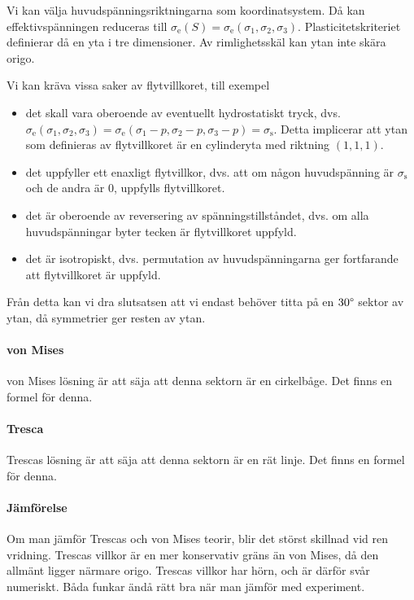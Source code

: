 Vi kan välja huvudspänningsriktningarna som koordinatsystem. Då kan effektivspänningen reduceras till $\sigma_{\text{e}}(S) = \sigma_{\text{e}}(\sigma_{1}, \sigma_{2}, \sigma_{3})$. Plasticitetskriteriet definierar då en yta i tre dimensioner. Av rimlighetsskäl kan ytan inte skära origo.

Vi kan kräva vissa saker av flytvillkoret, till exempel
\begin{itemize}
	\item det skall vara oberoende av eventuellt hydrostatiskt tryck, dvs. $\sigma_{\text{e}}(\sigma_{1}, \sigma_{2}, \sigma_{3}) = \sigma_{\text{e}}(\sigma_{1} - p, \sigma_{2}- p, \sigma_{3}- p) = \sigma_{\text{s}}$. Detta implicerar att ytan som definieras av flytvillkoret är en cylinderyta med riktning $(1, 1, 1)$.
	\item det uppfyller ett enaxligt flytvillkor, dvs. att om någon huvudspänning är $\sigma_{\text{s}}$ och de andra är $0$, uppfylls flytvillkoret.
	\item det är oberoende av reversering av spänningstillståndet, dvs. om alla huvudspänningar byter tecken är flytvillkoret uppfyld.
	\item det är isotropiskt, dvs. permutation av huvudspänningarna ger fortfarande att flytvillkoret är uppfyld.
\end{itemize}
Från detta kan vi dra slutsatsen att vi endast behöver titta på en $30\degree$ sektor av ytan, då symmetrier ger resten av ytan.

\paragraph{von Mises}
von Mises lösning är att säja att denna sektorn är en cirkelbåge. Det finns en formel för denna.

\paragraph{Tresca}
Trescas lösning är att säja att denna sektorn är en rät linje. Det finns en formel för denna.

\paragraph{Jämförelse}
Om man jämför Trescas och von Mises teorir, blir det störst skillnad vid ren vridning. Trescas villkor är en mer konservativ gräns än von Mises, då den allmänt ligger närmare origo. Trescas villkor har hörn, och är därför svår numeriskt. Båda funkar ändå rätt bra när man jämför med experiment.